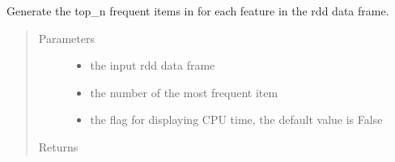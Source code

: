 \documentclass[letterpaper,12pt,english]{sphinxmanual}
\begin{document}
\begin{fulllineitems}
Generate the top\_n frequent items in for each feature in the rdd data frame.
\begin{quote}\begin{description}
\item[{Parameters}] \leavevmode\begin{itemize}
\item {} 
 \textendash{} the input rdd data frame

\item {} 
 \textendash{} the number of the most frequent item

\item {} 
 \textendash{} the flag for displaying CPU time, the default value is False

\end{itemize}

\item[{Returns}] \leavevmode


\end{description}\end{quote}


\end{fulllineitems}
\end{document}
